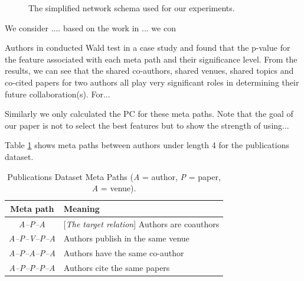\begin{figure}[t]
\centering
{}
\caption{The simplified network schema used for our experiments.} \label{Fig:expSchema}
\end{figure}


We consider .... based on the work in ... we con

Authors in \cite{sun2011ASONAM} conducted Wald test in a case study and found that the p-value for the feature associated with each meta path and their significance level. From the results, we can see that the shared co-authors, shared venues, shared topics and co-cited papers for two authors all play very significant roles in determining their future collaboration(s). For...

Similarly we only calculated the PC for these meta paths. Note that the goal of our paper is not to select the best features but to show the strength of using...

Table \ref{table_publications} shows meta paths between authors under length 4 for the publications dataset.


\begin{table}[h]
\centering
\caption{Publications Dataset Meta Paths (\textit{A} = author, \textit{P} = paper, \textit{A} = venue).}
\label{table_publications}
\begin{tabular}{|c|l|} \hline
\textbf{Meta path} & \textbf{Meaning} \\ \hline

\textit{A--P--A} & [\textit{The target relation}] Authors are coauthors \\ \hline
\textit{A--P--V--P--A} & Authors publish in the same venue \\ \hline
\textit{A--P--A--P--A} & Authors have the same co-author \\ \hline
\textit{A--P--P--P--A} & Authors cite the same papers \\ \hline

\end{tabular}
\end{table}

